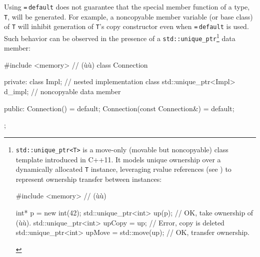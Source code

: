 Using \lstinline!=!\,\lstinline!default! does not guarantee that the special
member function of a type, \lstinline!T!, will be generated. For example, a
noncopyable member variable (or base class) of \lstinline!T! will inhibit
generation of \lstinline!T!'s copy constructor even when
\lstinline!=!\,\lstinline!default! is used. Such behavior can be observed in
the presence of a \lstinline!std::unique_ptr!{\cprotect\footnote{\lstinline!std::unique_ptr<T>!
is a move-only (movable but noncopyable) class template introduced in
C++11. It models unique ownership over a dynamically allocated
  \lstinline!T! instance, leveraging rvalue references (see )
  to represent ownership transfer between instances:

  \begin{emcppshiddenlisting}[emcppsbatch=e5,style=footcode]
  #include <memory>  // (ù{}ù)
  \end{emcppshiddenlisting}
  \begin{emcppslisting}[emcppsbatch=e5,basicstyle={\ttfamily\footnotesize}]
  int* p = new int(42);
  std::unique_ptr<int> up(p);                   // OK, take ownership of (ù{}ù).
  std::unique_ptr<int> upCopy = up;             // Error, copy is deleted
  std::unique_ptr<int> upMove = std::move(up);  // OK, transfer ownership.
  \end{emcppslisting}\vspace*{-1ex}
      }} data member:

\begin{emcppslisting}
#include <memory>  // (ù{}ù)
class Connection
{
private:
    class Impl;                    // nested implementation class
    std::unique_ptr<Impl> d_impl;  // noncopyable data member

public:
    Connection() = default;
    Connection(const Connection&) = default;
};
\end{emcppslisting}
\pagebreak%

